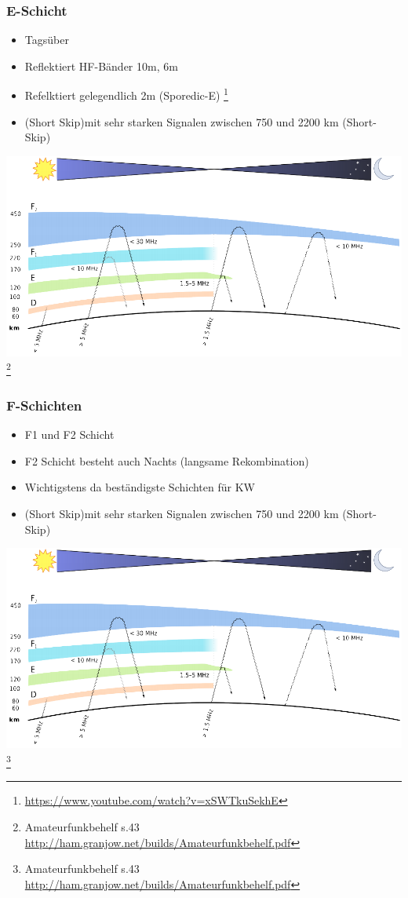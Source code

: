 \begin{frame}
    \frametitle{E-Schicht}
    \begin{itemize}
    			\item Tagsüber
				\item Reflektiert HF-Bänder 10m, 6m
       		 	\item Refelktiert gelegendlich 2m (Sporedic-E) \footnote{\tiny \url{https://www.youtube.com/watch?v=xSWTkuSekhE}}
       		 	\item (Short Skip)mit sehr starken Signalen zwischen 750 und 2200 km (Short-Skip)
    \end{itemize}
    \begin{center}
        \includegraphics[width=.75\textwidth]{a08/schichten_behelf_43.png}
        \footnote{\tiny Amateurfunkbehelf s.43 \url{http://ham.granjow.net/builds/Amateurfunkbehelf.pdf}}
    \end{center}
\end{frame}

\begin{frame}
    \frametitle{F-Schichten}
    \begin{itemize}
    			\item F1 und F2 Schicht
				\item F2 Schicht besteht auch Nachts (langsame Rekombination)
       		 	\item Wichtigstens da beständigste Schichten für KW
       		 	\item (Short Skip)mit sehr starken Signalen zwischen 750 und 2200 km (Short-Skip)
    \end{itemize}
	\begin{center}
        \includegraphics[width=.75\textwidth]{a08/schichten_behelf_43.png}
        \footnote{\tiny Amateurfunkbehelf s.43 \url{http://ham.granjow.net/builds/Amateurfunkbehelf.pdf}}
    \end{center}
\end{frame}

